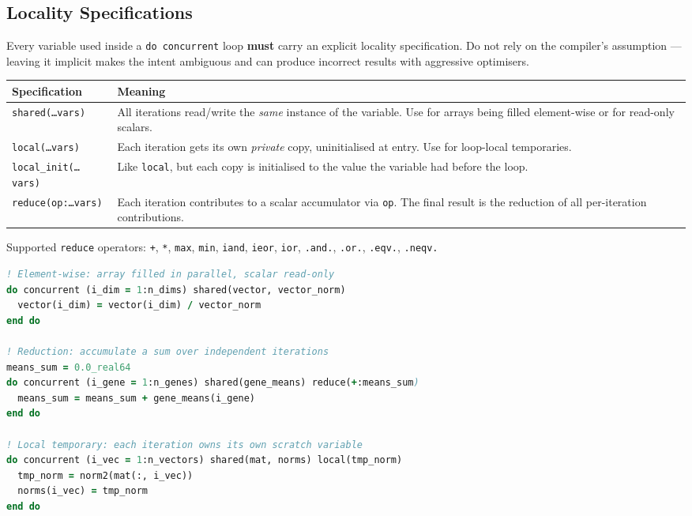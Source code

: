 \documentclass{article}
\begin{document}
\subsection{Locality Specifications}

Every variable used inside a \texttt{do concurrent} loop \textbf{must} carry an explicit locality specification. Do not rely on the compiler's assumption — leaving it implicit makes the intent ambiguous and can produce incorrect results with aggressive optimisers.

\begin{tabular}{lp{9cm}}
\toprule
Specification & Meaning \\
\midrule
\texttt{shared(\ldots vars)} & All iterations read/write the \emph{same} instance of the variable. Use for arrays being filled element-wise or for read-only scalars. \\
\texttt{local(\ldots vars)} & Each iteration gets its own \emph{private} copy, uninitialised at entry. Use for loop-local temporaries. \\
\texttt{local\_init(\ldots vars)} & Like \texttt{local}, but each copy is initialised to the value the variable had before the loop. \\
\texttt{reduce(op:\ldots vars)} & Each iteration contributes to a scalar accumulator via \texttt{op}. The final result is the reduction of all per-iteration contributions. \\
\bottomrule
\end{tabular}

\vspace{0.5em}
\noindent Supported \texttt{reduce} operators: \texttt{+}, \texttt{*}, \texttt{max}, \texttt{min}, \texttt{iand}, \texttt{ieor}, \texttt{ior}, \texttt{.and.}, \texttt{.or.}, \texttt{.eqv.}, \texttt{.neqv.}

\begin{lstlisting}[language=Fortran]
! Element-wise: array filled in parallel, scalar read-only
do concurrent (i_dim = 1:n_dims) shared(vector, vector_norm)
  vector(i_dim) = vector(i_dim) / vector_norm
end do

! Reduction: accumulate a sum over independent iterations
means_sum = 0.0_real64
do concurrent (i_gene = 1:n_genes) shared(gene_means) reduce(+:means_sum)
  means_sum = means_sum + gene_means(i_gene)
end do

! Local temporary: each iteration owns its own scratch variable
do concurrent (i_vec = 1:n_vectors) shared(mat, norms) local(tmp_norm)
  tmp_norm = norm2(mat(:, i_vec))
  norms(i_vec) = tmp_norm
end do
\end{lstlisting}
\end{document}
